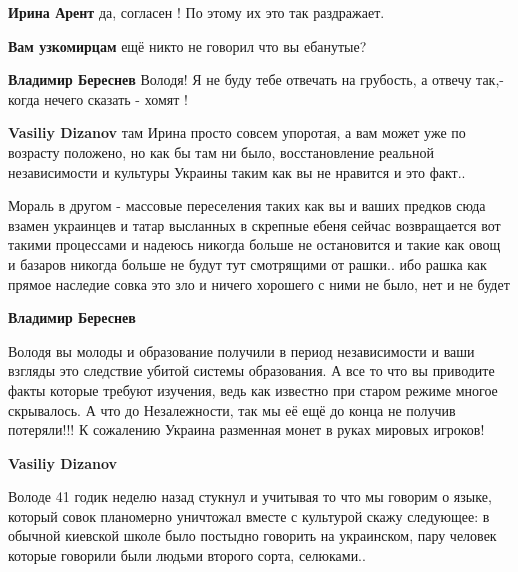 \begin{itemize}
\begin{itemize}
\textbf{Ирина Арент} да, согласен ! По этому их это так раздражает.


\textbf{Вам узкомирцам} ещё никто не говорил что вы ебанутые? 🤦


\textbf{Владимир Береснев} Володя! Я не буду тебе отвечать на грубость, а отвечу так,- когда нечего сказать - хомят !


\textbf{Vasiliy Dizanov} там Ирина просто совсем упоротая, а вам может уже по
возрасту положено, но как бы там ни было, восстановление реальной независимости
и культуры Украины таким как вы не нравится и это факт..

Мораль в другом - массовые переселения таких как вы и ваших предков сюда взамен
украинцев и татар высланных в скрепные ебеня сейчас возвращается вот такими
процессами и надеюсь никогда больше не остановится и такие как овощ и базаров
никогда больше не будут тут смотрящими от рашки.. ибо рашка как прямое наследие
совка это зло и ничего хорошего с ними не было, нет и не будет


\textbf{Владимир Береснев} 

Володя вы молоды и образование получили в период независимости и ваши взгляды
это следствие убитой системы образования. А все то что вы приводите факты
которые требуют изучения, ведь как известно при старом режиме многое
скрывалось. А что до Незалежности, так мы её ещё до конца не получив
потеряли!!! К сожалению Украина разменная монет в руках мировых игроков!



\textbf{Vasiliy Dizanov} 

Володе 41 годик неделю назад стукнул и учитывая то что мы говорим о языке,
который совок планомерно уничтожал вместе с культурой скажу следующее: в
обычной киевской школе было постыдно говорить на украинском, пару человек
которые говорили были людьми второго сорта, селюками..


\end{itemize}
\end{itemize}
